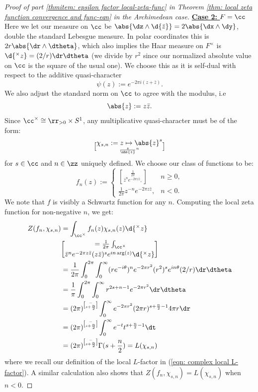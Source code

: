 \documentclass[11pt, x11names, openany]{book}
\begin{document}
\begin{proof}[Proof of part \ref{thmitem: epsilon factor local-zeta-func} in Theorem \ref{thm: local zeta function convergence and func-eqn} in the Archimedean case]
\textbf{\underline{Case 2: $F = \cc$}}\\
Here we let our measure on $\cc$ be $\abs{\dz  \wedge \d{\bar{z}}} = 2 \abs{\dx \wedge \dy}$, double the standard Lebesgue measure. In polar coordinates this is $2 r \abs{ \dr \wedge \dtheta}$, which also implies the Haar measure on $F^\times$ is $\d{^\times  z} = (2/r) \dr \dtheta$ (we divide by $r^2$ since our normalized absolute value on $\cc$ is the square of the usual one). We choose this as it is self-dual with respect to the additive quasi-character
\begin{equation*}
    \psi(z) := e^{- 2 \pi i (z + \bar{z})}.
\end{equation*} 
We also adjust the standard norm on $\cc$ to agree with the modulus, i.e
\begin{equation*}
    \abs{z} := z \bar{z}.
\end{equation*}
Since $\cc^\times \cong \rr_{> 0} \times S^1$, any multiplicative quasi-character must be of the form:
\begin{equation*}
    \chi_{s, n} := z \mapsto \abs{z}^s \brack{\frac{z}{\abs{z}}}^n
\end{equation*}
for $s \in \cc$ and $n \in \zz$ uniquely defined. We choose our class of functions to be:
\begin{equation*}
    f_n(z) := \begin{cases}
        \frac{1}{2\pi} \brack{\bar{z}}^n e^{- 2 \pi z \bar{z}}, & n \geq 0,\\
        \frac{1}{2\pi} z^{-n} e^{- 2 \pi z \bar{z}}, & n < 0.
    \end{cases}
\end{equation*}
We note that $f$ is visibly a Schwartz function for any $n$. Computing the local zeta function for non-negative $n$, we get:
\begin{align*}
    Z(f_n, \chi_{s, n}) &= \int_{\cc^\times} f_n(z) \chi_{s, n}(z)\d{^\times  z}\\
    &= \frac{1}{2\pi} \int_{\cc^\times}\brack{\bar{z}}^ne^{ - 2 \pi z \bar{z}}(z \bar{z})^s e^{i n \arg(z)}\d{^\times  z}\\
    &= \frac{1}{2\pi} \int^{2 \pi}_0 \int^\infty_0 (re^{-i \theta})^n e^{-2 \pi r^2} (r^2)^s e^{i n \theta} (2/r) \dr \dtheta\\
    &= \frac{1}{\pi} \int^{2\pi}_0 \int^\infty_0 r^{2s + n - 1} e^{-2 \pi r^2} \dr \dtheta\\
    &= (2 \pi)^{-\brack{s + \frac{n}{2}}} \int_0^\infty e^{- 2 \pi r^2} (2 \pi r)^{s + \frac{n}{2} - 1} 4 \pi r \dr\\
    &= (2 \pi)^{-\brack{s + \frac{n}{2}}} \int^\infty_0 e^{-t} t^{s + \frac{n}{2} - 1} \dt\\
    &= (2\pi)^{-\brack{s + \frac{n}{2}}} \Gamma(s + \frac{n}{2}) = L(\chi_{s, n})
\end{align*}
where we recall our definition of the local $L$-factor in (\ref{eqn: complex local L-factor}). A similar calculation also shows that $Z(f_n, \chi_{s, n}) = L(\chi_{s, n})$ when $n < 0$.


\end{proof}
\end{document}
